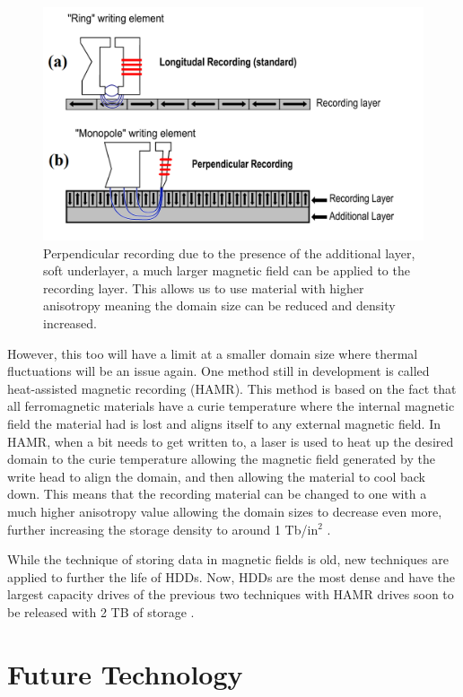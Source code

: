\documentclass[ notitlepage, numerical, 11pt]{revtex4-1} %
\begin{document}
\begin{figure}[H]
\centerline{\includegraphics[scale=.45]{perpendicularComparison.png}}
\caption{Perpendicular recording due to the presence of the additional layer, soft underlayer, a much larger magnetic field can be applied to the recording layer. This allows us to use material with higher anisotropy meaning the domain size can be reduced and density increased.}
\label{perpendicularComparison}
\end{figure}


However, this too will have a limit at a smaller domain size where thermal fluctuations will be an issue again. One method still in development is called heat-assisted magnetic recording (HAMR). This method is based on the fact that all ferromagnetic materials have a curie temperature where the internal magnetic field the material had is lost and aligns itself to any external magnetic field. In HAMR, when a bit needs to get written to, a laser is used to heat up the desired domain to the curie temperature allowing the magnetic field generated by the write head to align the domain, and then allowing the material to cool back down. This means that the recording material can be changed to one with a much higher anisotropy value allowing the domain sizes to decrease even more, further increasing the storage density to around 1 Tb/in$^2$ \cite{hamr}. 

While the technique of storing data in magnetic fields is old, new techniques are applied to further the life of HDDs. Now, HDDs are the most dense and have the largest capacity drives of the previous two techniques with HAMR drives soon to be released with 2 TB of storage \cite{seagate}.


\section{Future Technology}
\end{document}
